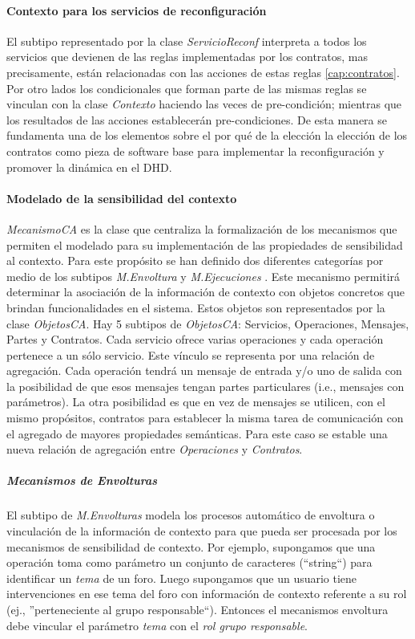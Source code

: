 \paragraph{Contexto para los servicios de reconfiguración}

El subtipo representado por la clase \textit{ServicioReconf} interpreta a todos
los servicios que devienen de las reglas implementadas por los contratos, mas
precisamente, están relacionadas con las acciones de estas reglas
\ref{cap:contratos}. Por otro lados los condicionales que forman parte de las
mismas reglas se vinculan con la clase \textit{Contexto} haciendo las veces de
pre-condición; mientras que los resultados de las acciones
establecerán  pre-condiciones. De esta manera se fundamenta una de los
elementos sobre el por qué de la elección la elección de los contratos como
pieza de software base para implementar la reconfiguración y promover la
dinámica en el DHD.  



\paragraph{Modelado de la sensibilidad del contexto}

\textit{MecanismoCA} es la clase que centraliza la formalización de los
mecanismos que permiten el modelado para su implementación de las propiedades
de sensibilidad al contexto. Para este propósito se han definido dos
diferentes categorías por medio de los subtipos \textit{M.Envoltura} y
\textit{M.Ejecuciones }. Este mecanismo permitirá determinar la asociación de
la información de contexto  con objetos concretos que brindan funcionalidades
en el sistema. Estos objetos son representados por la clase \textit{ObjetosCA}.
Hay 5 subtipos de \textit{ObjetosCA}: Servicios, Operaciones, Mensajes, Partes y
Contratos. Cada servicio ofrece varias operaciones y cada operación pertenece
a un sólo servicio. Este vínculo se representa por una relación de
agregación. Cada operación tendrá un mensaje de entrada y/o uno de salida
con la posibilidad de que esos mensajes tengan partes particulares (i.e.,
mensajes con parámetros). La otra posibilidad es que en vez de mensajes se
utilicen, con el mismo propósitos, contratos para establecer la misma tarea de
comunicación con el agregado de mayores propiedades semánticas.
Para este caso se estable una nueva relación de agregación entre
\textit{Operaciones} y \textit{Contratos}.



\subparagraph{Mecanismos de Envolturas}
El subtipo de \textit{M.Envolturas} modela los procesos automático de envoltura
o vinculación de la información de contexto para que pueda ser procesada por
los mecanismos de sensibilidad de contexto. Por ejemplo, supongamos que una
operación toma como parámetro un conjunto de caracteres (``string``) para
identificar un \textit{tema} de un foro. Luego supongamos que un usuario tiene
intervenciones en ese tema del foro con información de contexto referente a su
rol (ej., ''perteneciente al grupo responsable``). Entonces el mecanismos
envoltura debe vincular el parámetro \textit{tema} con el \textit{rol grupo
responsable}.

